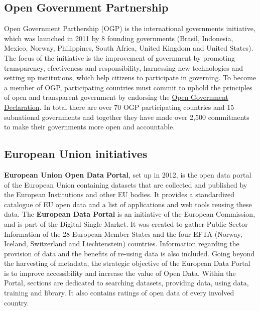 \documentclass[thesis=B,english]{sprlajur-slovakopendata}[2018/05/12]
\begin{document}
\subsection{Open Government Partnership}
Open Government Parthership (OGP) is the international governments initiative, which was launched in 2011 by 8 founding governments (Brasil, Indonesia, Mexico, Norway, Philippines, South Africa, United Kingdom and United States). The focus of the initiative is the improvement of government by promoting transparency, efectiveness and responsibility, harnessing new technologies and setting up institutions, which help citizens to participate in governing. To become a member of OGP, participating countries must commit to uphold the principles of open and transparent government by endorsing the \href{https://www.opengovpartnership.org/open-government-declaration}{Open Government Declaration}. In total there are over 70 OGP participating countries and 15 subnational governments and together they have made over 2,500 commitments to make their governments more open and accountable. \cite{opengovernmentpartnership}
	
\subsection{European Union initiatives}
\label{euinitiatives}
\textbf{European Union Open Data Portal}, set up in 2012, is the open data portal of the European Union containing datasets that are collected and published by the European Institutions and other EU bodies. It provides a standardized catalogue of EU open data and a list of applications and web tools reusing these data. \cite{EUopendataportal}
\hspace{10000px}
The \textbf{European Data Portal} is an initiative of the European Commission, and is part of the Digital Single Market. It was created to gather Public Sector Information of the 28 European Member States and the four EFTA (Norway, Iceland, Switzerland and Liechtenstein) countries. Information regarding the provision of data and the benefits of re-using data is also included. Going beyond the harvesting of metadata, the strategic objective of the European Data Portal is to improve accessibility and increase the value of Open Data. Within the Portal, sections are dedicated to searching datasets, providing data, using data, training and library. It also contains ratings of open data of every involved country. \cite{eudataportal}
\end{document}
